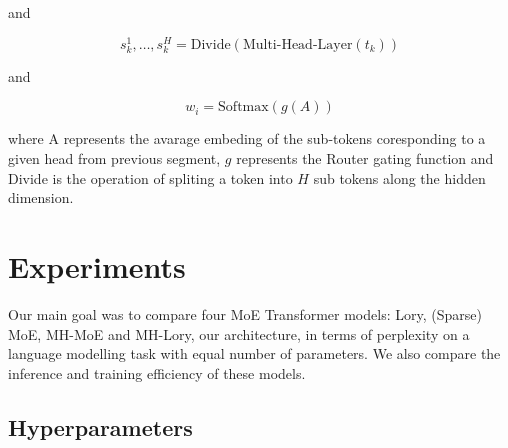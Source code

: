 \documentclass[12pt]{article}
\begin{document}
and

\[s_k^1,\dots, s_k^H = \text{Divide}(\text{Multi-Head-Layer}(t_k))\]

and

\[w_i = \text{Softmax}(g(A))\]

where A represents the avarage embeding of the sub-tokens coresponding to a given head from previous segment, $g$ represents the Router gating function and Divide is the operation of spliting a token into $H$ sub tokens along the hidden dimension.



\section{Experiments}
Our main goal was to compare four MoE Transformer models: Lory, (Sparse) MoE, MH-MoE and MH-Lory, our architecture, in terms of perplexity on a language modelling task with equal number of parameters. We also compare the inference and training efficiency of these models.

\subsection{Hyperparameters}
\end{document}
